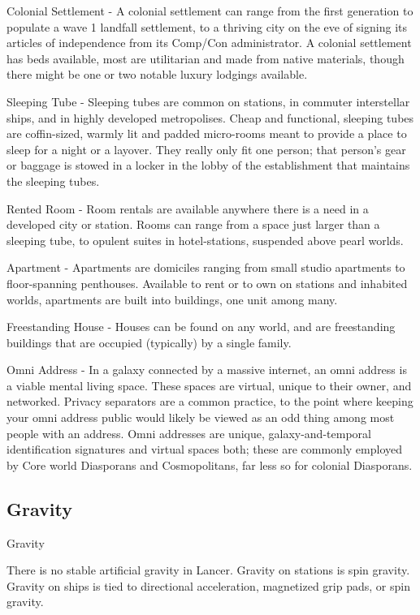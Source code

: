 Colonial Settlement - A colonial settlement can range from the first generation to populate a
wave 1 landfall settlement, to a thriving city on the eve of signing its articles of independence
from its Comp/Con administrator. A colonial settlement has beds available, most are utilitarian
and made from native materials, though there might be one or two notable luxury lodgings
available.



Sleeping Tube - Sleeping tubes are common on stations, in commuter interstellar ships, and in
highly developed metropolises. Cheap and functional, sleeping tubes are coffin-sized, warmly lit
and padded micro-rooms meant to provide a place to sleep for a night or a layover. They really
only fit one person; that person’s gear or baggage is stowed in a locker in the lobby of the
establishment that maintains the sleeping tubes.


Rented Room - Room rentals are available anywhere there is a need in a developed city or
station. Rooms can range from a space just larger than a sleeping tube, to opulent suites in
hotel-stations, suspended above pearl worlds.



Apartment  - Apartments are domiciles ranging from small studio apartments to floor-spanning
penthouses. Available to rent or to own on stations and inhabited worlds, apartments are built
into buildings, one unit among many.


Freestanding House - Houses can be found on any world, and are freestanding buildings that are
occupied (typically) by a single family.


Omni Address - In a galaxy connected by a massive internet, an omni address is a viable mental
living space. These spaces are virtual, unique to their owner, and networked. Privacy separators
are a common practice, to the point where keeping your omni address public would likely be
viewed as an odd thing among most people with an address. Omni addresses are unique,
galaxy-and-temporal identification signatures and virtual spaces both; these are commonly
employed by Core world Diasporans and Cosmopolitans, far less so for colonial Diasporans.




\subsection{Gravity}
Gravity

There is no stable artificial gravity in Lancer. Gravity on stations is spin gravity. Gravity on ships is
tied to directional acceleration, magnetized grip pads, or spin gravity.


